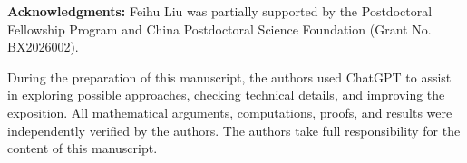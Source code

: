 \documentclass[reqno, 11pt]{article}
\numberwithin{equation}{section}
\theoremstyle{definition}
\numberwithin{equation}{section}
\begin{document}





\vspace{5mm}
\noindent
{\small \textbf{Acknowledgments:}}
Feihu Liu was partially supported by the Postdoctoral Fellowship Program and China Postdoctoral Science Foundation (Grant No. BX2026002).


During the preparation of this manuscript, the authors used ChatGPT to assist in exploring possible approaches, checking technical details, and improving the exposition. All mathematical arguments, computations, proofs, and results were independently verified by the authors. The authors take full responsibility for the content of this manuscript.
\end{document}
